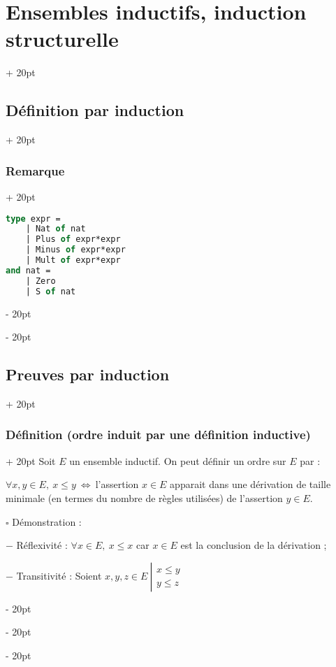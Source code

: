 \documentclass[a4paper, 12pt, twoside]{article}
\newcommand{\ssi}{\ \Leftrightarrow \ }
\renewcommand{\le}{\leqslant}
\newcommand{\ind}[1][20pt]{\advance\leftskip + #1}
\newcommand{\deind}[1][20pt]{\advance\leftskip - #1}
\newenvironment{indt}[2][20pt]{#2 \par \ind[#1]}{\par \deind} %
\begin{document}
\begin{indt}{\section{Ensembles inductifs, induction structurelle}}
\begin{indt}{\subsection{Définition par induction}}
\begin{indt}{\subsubsection{Remarque}}
                \begin{lstlisting}[language=Caml, xleftmargin=80pt]
type expr =
    | Nat of nat
    | Plus of expr*expr
    | Minus of expr*expr
    | Mult of expr*expr
and nat =
    | Zero
    | S of nat
                \end{lstlisting}
            \end{indt}
        \end{indt}
            
        \vspace{12pt}
        
        \begin{indt}{\subsection{Preuves par induction}}
            \begin{indt}{\subsubsection{Définition (ordre induit par une définition inductive)}}
                Soit $E$ un ensemble inductif. On peut définir un ordre sur $E$ par :
                
                $\forall x, y \in E,\ x \le y \ssi$l'assertion $x \in E$ apparait dans une dérivation de taille minimale (en termes du nombre de règles utilisées) de l'assertion $y \in E$.
                
                \vspace{12pt}
                
                $\square$ Démonstration :
                
                $-$ Réflexivité : $\forall x \in E,\ x \le x$ car $x \in E$ est la conclusion de la dérivation ;
                
                \vspace{6pt}
                
                $-$ Transitivité : Soient
                $
                    x, y, z \in E\
                    \left| \!
                    \begin{array}{l}
                        x \le y
                        \\
                        y \le z
                    \end{array}
                    \right.
                $
                

\end{indt}
\end{indt}
\end{indt}
\end{document}
